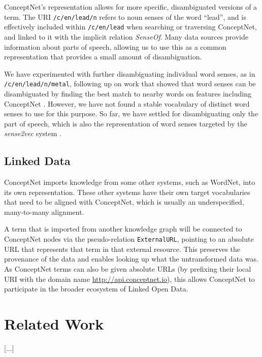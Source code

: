 \documentclass[letterpaper]{article}
\begin{document}
ConceptNet's representation allows for more specific, disambiguated
versions of a term. The URI \texttt{/c/en/lead/n} refers to noun senses
of the word ``lead'', and is effectively included within
\texttt{/c/en/lead} when searching or traversing ConceptNet, and
linked to it with the implicit relation \emph{SenseOf}. Many data
sources provide information about parts of speech, allowing us to use
this as a common representation that provides a small amount of
disambiguation.

We have experimented with further disambiguating individual word senses, as in
\texttt{/c/en/lead/n/metal}, following up on work that showed that word senses
can be disambiguated by finding the best match to nearby words on features
including ConceptNet \cite{havasi2010coarse}. However, we have not found a
stable vocabulary of distinct word senses to use for this purpose. So far,
we have settled for disambiguating only the part of speech, which is also the
representation of word senses targeted by the \emph{sense2vec} system
\cite{trask2015sense2vec}.

\subsection{Linked Data}

ConceptNet imports knowledge from some other systems, such as WordNet, into its
own representation. These other systems have their own target vocabularies that
need to be aligned with ConceptNet, which is usually an underspecified,
many-to-many alignment.

A term that is imported from another knowledge graph will be connected to
ConceptNet nodes via the pseudo-relation \texttt{ExternalURL}, pointing to an
absolute URL that represents that term in that external resource.  This
preserves the provenance of the data and enables looking up what the
untransformed data was.  As ConceptNet terms can also be given absolute URLs
(by prefixing their local URI with the domain name
\url{http://api.conceptnet.io}), this allows ConceptNet to participate in the
broader ecosystem of Linked Open Data.

\section{Related Work}

[...]

\end{document}
